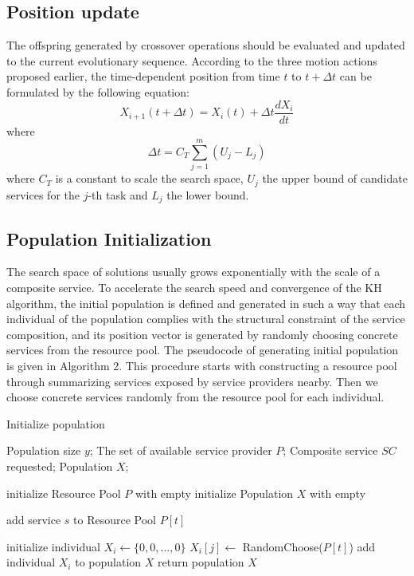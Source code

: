 \documentclass[journal]{IEEEtran}
\begin{document}
\subsection{Position update}
The offspring generated by crossover operations should be evaluated and updated to the current evolutionary sequence.
According to the three motion actions proposed earlier, the time-dependent position from time $t$ to $t + \Delta t$ can be formulated by the following equation:
\begin{equation}
X_{i+1}(t+\Delta t) = X_i(t) + \Delta t \frac{dX_i}{dt}
\end{equation}
where
\begin{equation}
\Delta t = C_T\sum_{j=1}^{m}(U_j - L_j)
\end{equation}
where $C_T$ is a constant to scale the search space, $U_j$ the upper bound of candidate services for the $j$-th task and $L_j$ the lower bound.

\subsection{Population Initialization}
The search space of solutions usually grows exponentially with the scale of a composite service. To accelerate the search speed and convergence of the KH algorithm, the initial population is defined and generated in such a way that each individual of the population complies with the structural constraint of the service composition, and its position vector is generated by randomly choosing concrete services from the resource pool. The pseudocode of generating initial population is given in Algorithm 2. This procedure starts with constructing a resource pool through summarizing services exposed by service providers nearby. Then we choose concrete services randomly from the resource pool for each individual. 

\begin{algorithm}
\caption{Initialize population}
\label{Initialize population}
\begin{algorithmic}[1]

\REQUIRE Population size $y$; The set of available service provider $P$; Composite service $SC$ requested;
\ENSURE Population $X$;

\STATE initialize Resource Pool $P$ with empty
\STATE initialize Population $X$ with empty

      \STATE add service $s$ to Resource Pool $P[t]$
    \ENDIF
  \ENDFOR  
\ENDFOR

  \STATE initialize individual $X_i \leftarrow \{0,0,...,0\}$
    \STATE $X_i[j] \leftarrow$ RandomChoose($P[t]$)
  \ENDFOR
  \STATE add individual $X_i$ to population $X$
\ENDFOR
\STATE return population $X$
\end{algorithmic}
\end{algorithm}
\end{document}
